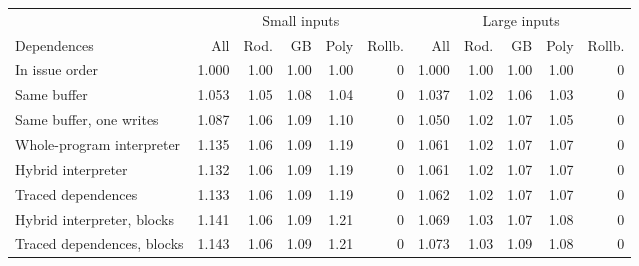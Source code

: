 \begin{tabular}{lrrrrrrrrrr}
\toprule
 & \multicolumn{5}{c}{Small inputs} & \multicolumn{5}{c}{Large inputs} \\
\cmidrule(lr){2-6} \cmidrule(lr){7-11}
Dependences & All & Rod. & GB & Poly & Rollb. & All & Rod. & GB & Poly & Rollb. \\
\midrule
In issue order & 1.000 & 1.00 & 1.00 & 1.00 & 0 & 1.000 & 1.00 & 1.00 & 1.00 & 0 \\
Same buffer & 1.053 & 1.05 & 1.08 & 1.04 & 0 & 1.037 & 1.02 & 1.06 & 1.03 & 0 \\
Same buffer, one writes & 1.087 & 1.06 & 1.09 & 1.10 & 0 & 1.050 & 1.02 & 1.07 & 1.05 & 0 \\
\midrule
Whole-program interpreter & 1.135 & 1.06 & 1.09 & 1.19 & 0 & 1.061 & 1.02 & 1.07 & 1.07 & 0 \\
Hybrid interpreter & 1.132 & 1.06 & 1.09 & 1.19 & 0 & 1.061 & 1.02 & 1.07 & 1.07 & 0 \\
Traced dependences & 1.133 & 1.06 & 1.09 & 1.19 & 0 & 1.062 & 1.02 & 1.07 & 1.07 & 0 \\
\midrule
Hybrid interpreter, blocks & 1.141 & 1.06 & 1.09 & 1.21 & 0 & 1.069 & 1.03 & 1.07 & 1.08 & 0 \\
Traced dependences, blocks & 1.143 & 1.06 & 1.09 & 1.21 & 0 & 1.073 & 1.03 & 1.09 & 1.08 & 0 \\
\bottomrule
\end{tabular}
